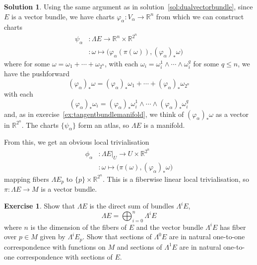 \documentclass[11pt, a4paper]{report}
\theoremstyle{definition}
\newtheorem{exercise}{Exercise}[part]
\newtheorem{solution}{Solution}[part]
\newenvironment{ex}{\begin{exercise}}{\end{exercise}\pagebreak[1]}
\newenvironment{sol}{\begin{solution}}{\end{solution}\pagebreak[3]}
\renewcommand{\leq}{\leqslant}
\begin{document}
\begin{sol}

Using the same argument as in solution~\ref{sol:dualvectorbundle}, since $E$ is a vector bundle, we have charts $\varphi_\alpha: V_\alpha \to \mathbb{R}^n$ from which we can construct charts
\begin{align*}
    \psi_\alpha &: \Lambda E \to \mathbb{R}^n \times \mathbb{R}^{2^n} \\
                &: \omega \mapsto \bigl(
                        \varphi_\alpha(\pi(\omega)), {(\varphi_\alpha)}_* \omega
                   \bigr)
\end{align*}
where for some $\omega = \omega_1 + \cdots + \omega_{2^n}$, with each $\omega_i = \omega_i^1 \wedge \cdots \wedge \omega_i^q$ for some $q \leq n$, we have the pushforward
\[
    {(\varphi_\alpha)}_* \omega ={(\varphi_\alpha)}_* \omega_1 + \cdots + {(\varphi_\alpha)}_* \omega_{2^n}
\]
with each
\[
    {(\varphi_\alpha)}_* \omega_i ={(\varphi_\alpha)}_* \omega_i^1 \wedge \cdots \wedge {(\varphi_\alpha)}_* \omega_i^q
\]
and, as in exercise~\ref{ex:tangentbundlemanifold}, we think of ${(\varphi_\alpha)}_* \omega$ as a vector in $\mathbb{R}^{2^n}$.
The charts $\{\psi_\alpha\}$ form an atlas, so $\Lambda E$ is a manifold.

From this, we get an obvious local trivialisation
\begin{align*}
    \phi_\alpha &: \Lambda E|_U \to U \times \mathbb{R}^{2^n} \\
                &: \omega \mapsto \bigl( \pi(\omega), {(\varphi_\alpha)}_* \omega \bigr)
\end{align*}
mapping fibers $\Lambda E_p$ to $\{p\} \times \mathbb{R}^{2^n}$.
This is a fiberwise linear local trivialisation, so $\pi: \Lambda E \to M$ is a vector bundle.

\end{sol}

\begin{ex}

Show that $\Lambda E$ is the direct sum of bundles $\Lambda^i E$,
\[
    \Lambda E = \bigoplus_{i = 0}^n \Lambda^i E
\]
where $n$ is the dimension of the fibers of $E$ and the vector bundle $\Lambda^i E$ has fiber over $p \in M$ given by $\Lambda^i E_p$.
Show that sections of $\Lambda^0 E$ are in natural one-to-one correspondence with functions on $M$ and sections of $\Lambda^1 E$ are in natural one-to-one correspondence with sections of $E$.

\end{ex}
\end{document}
